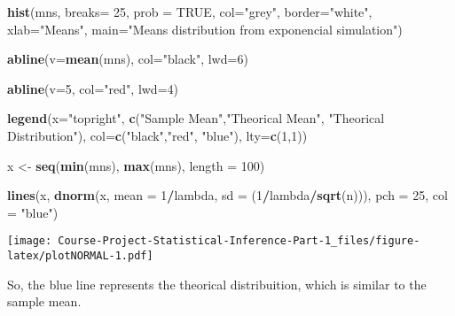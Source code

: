\documentclass[]{article}
\newenvironment{Shaded}{\begin{snugshade}}{\end{snugshade}}
\newcommand{\DataTypeTok}[1]{\textcolor[rgb]{0.13,0.29,0.53}{#1}}
\newcommand{\DecValTok}[1]{\textcolor[rgb]{0.00,0.00,0.81}{#1}}
\newcommand{\KeywordTok}[1]{\textcolor[rgb]{0.13,0.29,0.53}{\textbf{#1}}}
\newcommand{\NormalTok}[1]{#1}
\newcommand{\OperatorTok}[1]{\textcolor[rgb]{0.81,0.36,0.00}{\textbf{#1}}}
\newcommand{\OtherTok}[1]{\textcolor[rgb]{0.56,0.35,0.01}{#1}}
\newcommand{\StringTok}[1]{\textcolor[rgb]{0.31,0.60,0.02}{#1}}
\begin{document}
\begin{Shaded}
\begin{Highlighting}[]
\KeywordTok{hist}\NormalTok{(mns, }
     \DataTypeTok{breaks=} \DecValTok{25}\NormalTok{,}
     \DataTypeTok{prob =} \OtherTok{TRUE}\NormalTok{,}
     \DataTypeTok{col=}\StringTok{"grey"}\NormalTok{, }
     \DataTypeTok{border=}\StringTok{"white"}\NormalTok{, }
     \DataTypeTok{xlab=}\StringTok{"Means"}\NormalTok{, }
     \DataTypeTok{main=}\StringTok{"Means distribution from exponencial simulation"}\NormalTok{)}
  
\KeywordTok{abline}\NormalTok{(}\DataTypeTok{v=}\KeywordTok{mean}\NormalTok{(mns), }
       \DataTypeTok{col=}\StringTok{"black"}\NormalTok{,}
       \DataTypeTok{lwd=}\DecValTok{6}\NormalTok{)}

\KeywordTok{abline}\NormalTok{(}\DataTypeTok{v=}\DecValTok{5}\NormalTok{, }
       \DataTypeTok{col=}\StringTok{"red"}\NormalTok{,}
       \DataTypeTok{lwd=}\DecValTok{4}\NormalTok{)}

\KeywordTok{legend}\NormalTok{(}\DataTypeTok{x=}\StringTok{"topright"}\NormalTok{,}
      \KeywordTok{c}\NormalTok{(}\StringTok{"Sample Mean"}\NormalTok{,}\StringTok{"Theorical Mean"}\NormalTok{, }\StringTok{"Theorical Distribution"}\NormalTok{),}
      \DataTypeTok{col=}\KeywordTok{c}\NormalTok{(}\StringTok{"black"}\NormalTok{,}\StringTok{"red"}\NormalTok{, }\StringTok{"blue"}\NormalTok{),}
      \DataTypeTok{lty=}\KeywordTok{c}\NormalTok{(}\DecValTok{1}\NormalTok{,}\DecValTok{1}\NormalTok{))}

\NormalTok{x <-}\StringTok{ }\KeywordTok{seq}\NormalTok{(}\KeywordTok{min}\NormalTok{(mns), }\KeywordTok{max}\NormalTok{(mns), }\DataTypeTok{length =} \DecValTok{100}\NormalTok{)}

\KeywordTok{lines}\NormalTok{(x, }\KeywordTok{dnorm}\NormalTok{(x, }\DataTypeTok{mean =} \DecValTok{1}\OperatorTok{/}\NormalTok{lambda, }\DataTypeTok{sd =}\NormalTok{ (}\DecValTok{1}\OperatorTok{/}\NormalTok{lambda}\OperatorTok{/}\KeywordTok{sqrt}\NormalTok{(n))), }\DataTypeTok{pch =} \DecValTok{25}\NormalTok{, }\DataTypeTok{col =} \StringTok{"blue"}\NormalTok{)}
\end{Highlighting}
\end{Shaded}

\texttt{[image: Course-Project-Statistical-Inference-Part-1\_files/figure-latex/plotNORMAL-1.pdf]}

So, the blue line represents the theorical distribuition, which is
similar to the sample mean.
\end{document}
